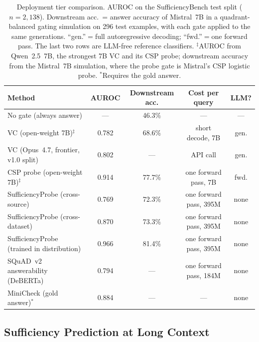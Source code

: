 \documentclass[acmsmall,screen,review]{acmart}
\newcommand{\bench}{SufficiencyBench}
\newcommand{\sprobe}{SufficiencyProbe}
\begin{document}
\begin{table}[t]
\centering
\caption{Deployment tier comparison. AUROC on the \bench{} test split ($n{=}2{,}138$). Downstream acc.\ = answer accuracy of Mistral~7B in a quadrant-balanced gating simulation on 296 test examples, with each gate applied to the same generations. ``gen.''$=$full autoregressive decoding; ``fwd.''$=$one forward pass. The last two rows are LLM-free reference classifiers. $^\ddagger$AUROC from Qwen~2.5~7B, the strongest 7B VC and its CSP probe; downstream accuracy from the Mistral~7B simulation, where the probe gate is Mistral's CSP logistic probe. $^*$Requires the gold answer.}
\label{tab:deployment}
\small
\begin{tabular}{@{}lcccc@{}}
\toprule
Method & AUROC & Downstream acc. & Cost per query & LLM? \\
\midrule
No gate (always answer) & --- & 46.3\% & --- & --- \\
VC (open-weight 7B)$^\ddagger$ & 0.782 & 68.6\% & short decode, 7B & gen. \\
VC (Opus~4.7, frontier, v1.0 split) & 0.802 & --- & API call & gen. \\
CSP probe (open-weight 7B)$^\ddagger$ & 0.914 & 77.7\% & one forward pass, 7B & fwd. \\
\sprobe{} (cross-source)       & 0.769 & 72.3\% & one forward pass, 395M & none \\
\sprobe{} (cross-dataset)      & 0.870 & 73.3\% & one forward pass, 395M & none \\
\sprobe{} (trained in distribution) & 0.966 & 81.4\% & one forward pass, 395M & none \\
SQuAD~v2 answerability (DeBERTa) & 0.794 & --- & one forward pass, 184M & none \\
MiniCheck (gold answer)$^*$   & 0.884 & --- & --- & none \\
\bottomrule
\end{tabular}
\end{table}

\subsection{Sufficiency Prediction at Long Context}
\label{sec:longcontext}
\end{document}
